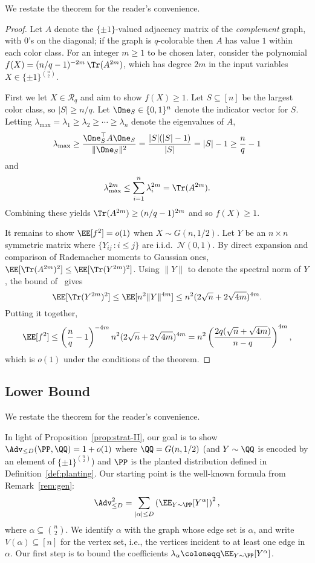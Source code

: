 \documentclass{article}
\begin{document}
We restate the theorem for the reader's convenience.

\thmrefupper*

\begin{proof}
Let $A$ denote the $\{\pm 1\}$-valued adjacency matrix of the \emph{complement} graph, with $0$'s on the diagonal; if the graph is $q$-colorable then $A$ has value $1$ within each color class. For an integer $m \ge 1$ to be chosen later, consider the polynomial $f(X) = (n/q - 1)^{-2m}\, \Tr(A^{2m})$, which has degree $2m$ in the input variables $X \in \{\pm 1\}^{\binom{n}{2}}$.

First we let $X \in \mathcal{R}_q$ and aim to show $f(X) \ge 1$. Let $S \subseteq [n]$ be the largest color class, so $|S| \ge n/q$. Let $\One_S \in \{0,1\}^n$ denote the indicator vector for $S$. Letting $\lambda_{\max} = \lambda_1 \ge \lambda_2 \ge \cdots \ge \lambda_n$ denote the eigenvalues of $A$,
\[ \lambda_{\max} \ge \frac{\One_S^\top A \One_S}{\|\One_S\|^2} = \frac{|S|(|S|-1)}{|S|} = |S|-1 \ge \frac{n}{q}-1 \]
and
\[ \lambda_{\max}^{2m} \le \sum_{i=1}^n \lambda_i^{2m} = \Tr(A^{2m}). \]
Combining these yields $\Tr(A^{2m}) \ge (n/q - 1)^{2m}$ and so $f(X) \ge 1$.

It remains to show $\EE[f^2] = o(1)$ when $X \sim G(n,1/2)$. Let $Y$ be an $n \times n$ symmetric matrix where $\{Y_{ij} \,: i \le j\}$ are i.i.d.\ $\mathcal{N}(0,1)$. By direct expansion and comparison of Rademacher moments to Gaussian ones, $\EE[\Tr(A^{2m})^2] \le \EE[\Tr(Y^{2m})^2]$. Using $\|Y\|$ to denote the spectral norm of $Y$, the bound of~\cite[Lemma~2.2]{BvH} gives
\[ \EE[\Tr(Y^{2m})^2] \le \EE[n^2 \|Y\|^{4m}] \le n^2 (2\sqrt{n} + 2\sqrt{4m})^{4m}. \]
Putting it together,
\[ \EE[f^2] \le \left(\frac{n}{q}-1\right)^{-4m} n^2 (2\sqrt{n} + 2\sqrt{4m})^{4m} = n^2 \left(\frac{2q(\sqrt{n} + \sqrt{4m})}{n-q}\right)^{4m}, \]
which is $o(1)$ under the conditions of the theorem.
\end{proof}



\subsection{Lower Bound}
\label{sec:ref-lower}


We restate the theorem for the reader's convenience.

\thmreflower*


\noindent In light of Proposition~\ref{prop:strat-II}, our goal is to show $\Adv_{\le D}(\PP,\QQ) = 1+o(1)$ where $\QQ = G(n,1/2)$ (and $Y \sim \QQ$ is encoded by an element of $\{\pm 1\}^{\binom{n}{2}}$) and $\PP$ is the planted distribution defined in Definition~\ref{def:planting}. Our starting point is the well-known formula from Remark~\ref{rem:gen}:
\[ \Adv_{\le D}^2 = \sum_{|\alpha| \le D} \left(\EE_{Y \sim \PP}[Y^\alpha]\right)^2, \]
where $\alpha \subseteq \binom{n}{2}$. We identify $\alpha$ with the graph whose edge set is $\alpha$, and write $V(\alpha) \subseteq [n]$ for the vertex set, i.e., the vertices incident to at least one edge in $\alpha$. Our first step is to bound the coefficients $\lambda_\alpha \coloneqq \EE_{Y \sim \PP}[Y^\alpha]$.
\end{document}
